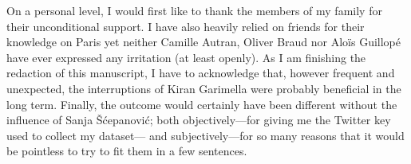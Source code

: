 On a personal level, I would first like to thank the members of my family for
their unconditional support. I have also heavily relied on friends for their
knowledge on Paris yet neither Camille Autran, Oliver Braud nor Aloïs Guillopé
have ever expressed any irritation (at least openly).  As I am finishing the
redaction of this manuscript, I have to acknowledge that, however frequent and
unexpected, the interruptions of Kiran Garimella were probably beneficial in
the long term. Finally, the outcome would certainly have been different without
the influence of Sanja Šćepanović; both objectively---for giving me the Twitter
key used to collect my dataset--- and subjectively---for so many reasons that
it would be pointless to try to fit them in a few sentences.

\endgroup
